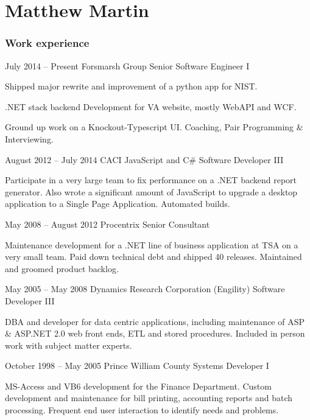 \documentclass{tccv}
\begin{document}
\part{Matthew Martin}

\section{Work experience}

\begin{eventlist}

\item{July 2014 -- Present}
     {Forsmarsh Group}
     {Senior Software Engineer I}

Shipped major rewrite and improvement of a python app for NIST.

.NET stack backend Development for VA website, mostly WebAPI and WCF. 

Ground up work on a Knockout-Typescript UI. Coaching, Pair Programming \& Interviewing.

\item{August 2012 -- July 2014}
     {CACI}
     {JavaScript and C\# Software Developer III }

Participate in a very large team to fix performance on a .NET backend 
report generator. Also wrote a significant amount of JavaScript to 
upgrade a desktop application to a Single Page Application. Automated builds.

\item{May 2008 -- August 2012}
     {Procentrix}
     {Senior Consultant}

Maintenance development for a .NET line of business application at TSA on a 
very small team. Paid down technical debt and shipped 40 releases. Maintained and groomed product backlog.

\item{May 2005 -- May 2008}
     {Dynamics Research Corporation (Engility)}
     {Software Developer III}

DBA and developer for data centric applications, including maintenance of
ASP \& ASP.NET 2.0 web front ends, ETL and stored procedures. Included in person work
with subject matter experts.

\item{October 1998 -- May 2005}
     {Prince William County}
     {Systems Developer I}

MS-Access and VB6 development for the Finance Department. Custom
development and maintenance for bill printing, accounting reports and
batch processing. Frequent end user interaction to identify needs and problems.

\end{eventlist}
\end{document}
